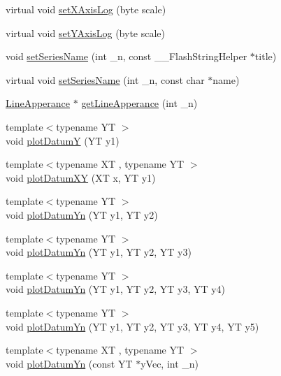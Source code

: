 \begin{DoxyCompactItemize}
\item 
virtual void \hyperlink{class_serial_graph_ae58de4fa4d391f1a2f411ce00dd74d93}{set\+X\+Axis\+Log} (byte scale)
\item 
virtual void \hyperlink{class_serial_graph_a444e38e8ef3784942ca6ee58940f7023}{set\+Y\+Axis\+Log} (byte scale)
\item 
void \hyperlink{class_serial_graph_a84d8e8ce9bff20e53ba738d1d34d3577}{set\+Series\+Name} (int \+\_\+n, const \+\_\+\+\_\+\+Flash\+String\+Helper $\ast$title)
\item 
virtual void \hyperlink{class_serial_graph_a9d67fbecbee6edb82646aa7ba5103046}{set\+Series\+Name} (int \+\_\+n, const char $\ast$name)
\item 
\hyperlink{struct_line_apperance}{Line\+Apperance} $\ast$ \hyperlink{class_serial_graph_a5a6008dc86a2101a58782929721a5b77}{get\+Line\+Apperance} (int \+\_\+n)
\item 
{\footnotesize template$<$typename Y\+T $>$ }\\void \hyperlink{class_serial_graph_afbcc26bd6bad7179d75379ac0f0d25f1}{plot\+Datum\+Y} (Y\+T y1)
\item 
{\footnotesize template$<$typename X\+T , typename Y\+T $>$ }\\void \hyperlink{class_serial_graph_a265b48fb0afe543e14cedb6619e3931e}{plot\+Datum\+X\+Y} (X\+T x, Y\+T y1)
\item 
{\footnotesize template$<$typename Y\+T $>$ }\\void \hyperlink{class_serial_graph_a56f584fa6316175bc9fbcb4f671f1c93}{plot\+Datum\+Yn} (Y\+T y1, Y\+T y2)
\item 
{\footnotesize template$<$typename Y\+T $>$ }\\void \hyperlink{class_serial_graph_ae755b026606e34c33c4aa8f10d8b5d9c}{plot\+Datum\+Yn} (Y\+T y1, Y\+T y2, Y\+T y3)
\item 
{\footnotesize template$<$typename Y\+T $>$ }\\void \hyperlink{class_serial_graph_a354feb95f91239699d3510c2ce5659b0}{plot\+Datum\+Yn} (Y\+T y1, Y\+T y2, Y\+T y3, Y\+T y4)
\item 
{\footnotesize template$<$typename Y\+T $>$ }\\void \hyperlink{class_serial_graph_ab0fff3fc1879e1cd6aadf24c913ff617}{plot\+Datum\+Yn} (Y\+T y1, Y\+T y2, Y\+T y3, Y\+T y4, Y\+T y5)
\item 
{\footnotesize template$<$typename X\+T , typename Y\+T $>$ }\\void \hyperlink{class_serial_graph_aa20b03efac52c18c50efc79c6459a9fc}{plot\+Datum\+Yn} (const Y\+T $\ast$y\+Vec, int \+\_\+n)

\end{DoxyCompactItemize}
